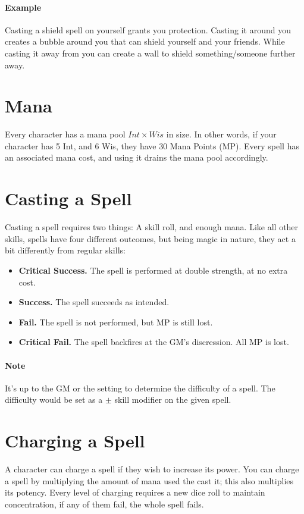 \paragraph{Example} Casting a shield spell on yourself grants you protection.
Casting it around you creates a bubble around you that can shield yourself and your friends.
While casting it away from you can create a wall to shield something/someone further away.

\section{Mana}
Every character has a mana pool $Int \times Wis$ in size.
In other words, if your character has 5 Int, and 6 Wis, they have 30 Mana Points (MP).
Every spell has an associated mana cost, and using it drains the mana pool accordingly.

\section{Casting a Spell}
Casting a spell requires two things: A skill roll, and enough mana.
Like all other skills, spells have four different outcomes, but being magic in nature, they act a bit differently from regular skills:
\begin{itemize}
\item \textbf{Critical Success.} The spell is performed at double strength, at no extra cost.
\item \textbf{Success.} The spell succeeds as intended.
\item \textbf{Fail.} The spell is not performed, but MP is still lost.
\item \textbf{Critical Fail.} The spell backfires at the GM's discression. All MP is lost.
\end{itemize}

\paragraph{Note} It's up to the GM or the setting to determine the difficulty of a spell.
The difficulty would be set as a $\pm$ skill modifier on the given spell.

\section{Charging a Spell}
A character can charge a spell if they wish to increase its power.
You can charge a spell by multiplying the amount of mana used the cast it;
this also multiplies its potency.
Every level of charging requires a new dice roll to maintain concentration, if any of them fail, the whole spell fails.

